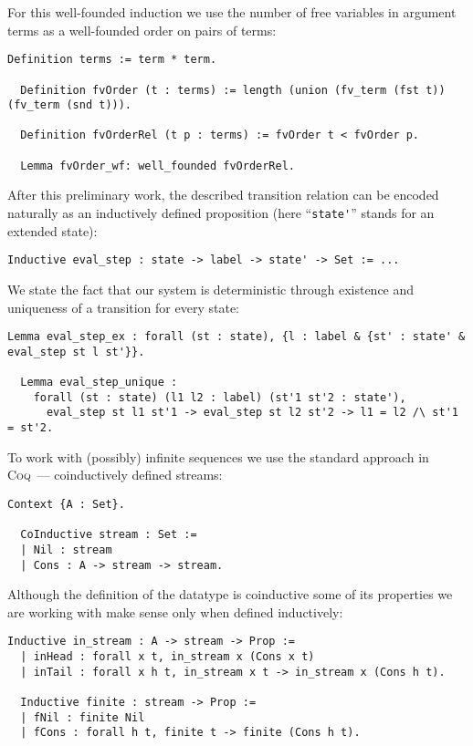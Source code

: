 For this well-founded induction we use the number of free variables in argument terms as a well-founded order on pairs of terms:

\begin{lstlisting}[language=Coq]
  Definition terms := term * term.

  Definition fvOrder (t : terms) := length (union (fv_term (fst t)) (fv_term (snd t))).

  Definition fvOrderRel (t p : terms) := fvOrder t < fvOrder p.

  Lemma fvOrder_wf: well_founded fvOrderRel.
\end{lstlisting}

After this preliminary work, the described transition relation can be encoded naturally as an inductively defined proposition (here ``\lstinline|state'|''
stands for an extended state):

\begin{lstlisting}[language=Coq]
  Inductive eval_step : state -> label -> state' -> Set := ...
\end{lstlisting}

We state the fact that our system is deterministic through existence and uniqueness of a transition for every state:

\begin{lstlisting}[language=Coq]
  Lemma eval_step_ex : forall (st : state), {l : label & {st' : state' & eval_step st l st'}}.

  Lemma eval_step_unique :
    forall (st : state) (l1 l2 : label) (st'1 st'2 : state'),
      eval_step st l1 st'1 -> eval_step st l2 st'2 -> l1 = l2 /\ st'1 = st'2.
\end{lstlisting}

To work with (possibly) infinite sequences we use the standard approach in \textsc{Coq}~--- coinductively defined streams:

\begin{lstlisting}[language=Coq]
  Context {A : Set}.

  CoInductive stream : Set :=
  | Nil : stream
  | Cons : A -> stream -> stream.
\end{lstlisting}

Although the definition of the datatype is coinductive some of its properties we are working with make sense only when defined inductively:

\begin{lstlisting}[language=Coq]
  Inductive in_stream : A -> stream -> Prop :=
  | inHead : forall x t, in_stream x (Cons x t)
  | inTail : forall x h t, in_stream x t -> in_stream x (Cons h t).

  Inductive finite : stream -> Prop :=
  | fNil : finite Nil
  | fCons : forall h t, finite t -> finite (Cons h t).
\end{lstlisting}

